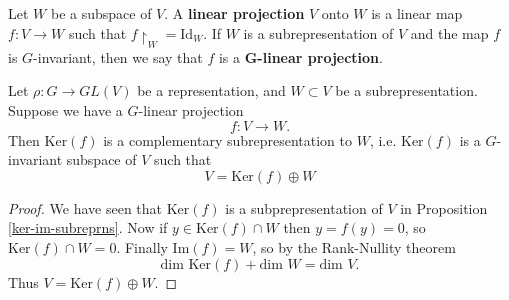 \begin{defn}
Let $W$ be a subspace of $V$.  A \textbf{linear projection} $V$ onto $W$ is a linear map $f \colon V \to W$ such that $f \restriction_{W} = \text{Id}_W$.  If $W$ is a subrepresentation of $V$ and the map $f$ is $G$-invariant, then we say that $f$ is a $\mathbf{G}$\textbf{-linear projection}.
\end{defn}

\begin{lemma} \label{maschke-lemma}
Let $\rho \colon G \to GL(V)$ be a representation, and $W \subset V$ be a subrepresentation.  Suppose we have a $G$-linear projection 
\[ f \colon V \to W. \]
Then $\text{Ker}(f)$ is a complementary subrepresentation to $W$, i.e. $\text{Ker}(f)$ is a $G$-invariant subspace of $V$ such that
\[ V = \text{Ker}(f) \oplus W \]
\end{lemma}
\begin{proof}
We have seen that $\text{Ker}(f)$ is a subprepresentation of $V$ in Proposition \ref{ker-im-subreprns}.
Now if $y \in \text{Ker}(f) \cap W$ then $y=f(y)=0$, so $\text{Ker}(f) \cap W = 0$.  Finally $\text{Im}(f)=W$, so by the Rank-Nullity theorem
\[ \text{dim Ker}(f) + \text{dim }W = \text{dim }V. \]
Thus $V = \text{Ker}(f) \oplus W$.  
\end{proof}

